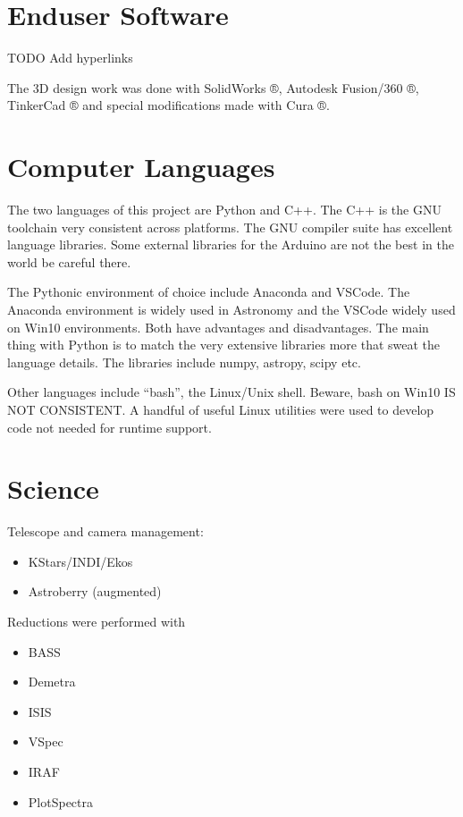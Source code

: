\documentclass[letterpaper,10pt,english,openany,oneside]{sphinxmanual}
\begin{document}
\section{End\sphinxhyphen{}user Software}
\label{\detokenize{software:end-user-software}}
\sphinxAtStartPar
TODO Add hyperlinks

\sphinxAtStartPar
The 3D design work was done with SolidWorks ®, Autodesk Fusion/360 ®,
TinkerCad ® and special modifications made with Cura ®.


\section{Computer Languages}
\label{\detokenize{software:computer-languages}}
\sphinxAtStartPar
The two languages of this project are Python and C++. The C++ is the
GNU toolchain \textendash{} very consistent across platforms. The GNU compiler
suite has excellent language libraries. Some external libraries
for the Arduino are not the best in the world \textendash{} be careful there.

\sphinxAtStartPar
The Pythonic environment of choice include Anaconda and VSCode. The
Anaconda environment is widely used in Astronomy and the VSCode widely
used on Win10 environments. Both have advantages and disadvantages.
The main thing with Python is to match the very extensive libraries
more that sweat the language details. The libraries include numpy, astropy,
scipy etc.

\sphinxAtStartPar
Other languages include “bash”, the Linux/Unix shell. Beware, bash on
Win10 IS NOT CONSISTENT. A handful of useful Linux utilities were used
to develop code \textendash{} not needed for run\sphinxhyphen{}time support.


\section{Science}
\label{\detokenize{software:science}}
\sphinxAtStartPar
Telescope and camera management:
\begin{itemize}
\item {} 
\sphinxAtStartPar
KStars/INDI/Ekos

\item {} 
\sphinxAtStartPar
Astroberry (augmented)

\end{itemize}

\sphinxAtStartPar
Reductions were performed with
\begin{itemize}
\item {} 
\sphinxAtStartPar
BASS

\item {} 
\sphinxAtStartPar
Demetra

\item {} 
\sphinxAtStartPar
ISIS

\item {} 
\sphinxAtStartPar
VSpec

\item {} 
\sphinxAtStartPar
IRAF

\item {} 
\sphinxAtStartPar
PlotSpectra

\end{itemize}
\end{document}

